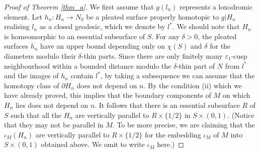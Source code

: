 \documentclass{amsart}
\theoremstyle{definition}
\numberwithin{figure}{section}
\numberwithin{equation}{section}
\begin{document}
\begin{proof}[Proof of Theorem \ref{thm_a}]
We first assume that $g(l_n)$ represents a loxodromic element.
Let $h_n: H_n \rightarrow N_0$ be a pleated surface properly homotopic to $g|H_n$ realising $l_n$ as a closed geodesic, which we denote by $l^*$.
We should note that $H_n$ is homeomorphic to an essential subsurface of $S$.
For any $\delta >0$, the pleated surfaces $h_n$ have an upper bound depending only on $\chi(S)$ and $\delta$ for the diameters modulo their $\delta$-thin parts.
Since there are only finitely many $\varepsilon_1$-cusp neighbourhood within a bounded distance modulo the $\delta$-thin part of $N$ from $l^*$ and the images of $h_n$ contain $l^*$, by taking a subsequence we can assume that the homotopy class of $\partial H_n$ does not depend on $n$.
By the condition (ii) which we have already proved, this implies that the boundary components of $M$ on which $H_n$ lies does not depend on $n$.
It follows that there is an essential subsurface $R$ of $S$ such that all the $H_n$ are vertically parallel to $R \times \{1/2\}$ in $S \times (0,1)$.
(Notice that they may not be parallel in $M$.
To be more precise, we are claiming that the $\iota_M(H_n)$ are vertically parallel to $R \times \{1/2\}$ for the embedding $\iota_M$ of $M$ into $S \times (0,1)$ obtained above.
We omit to write $\iota_M$ here.)


\end{proof}
\end{document}
